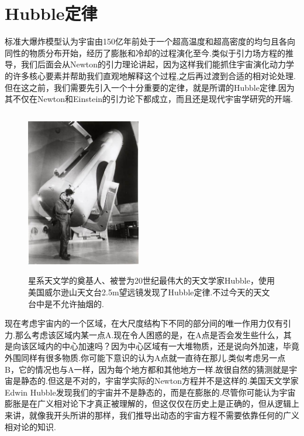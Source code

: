 \documentclass[a4paper]{book}
\begin{document}
\section{Hubble定律}
标准大爆炸模型认为宇宙由150亿年前处于一个超高温度和超高密度的均匀且各向同性的物质分布开始，经历了膨胀和冷却的过程演化至今.类似于引力场方程的推导，我们后面会从Newton的引力理论讲起，因为这样我们能抓住宇宙演化动力学的许多核心要素并帮助我们直观地解释这个过程,之后再过渡到合适的相对论处理.但在这之前，我们需要先引入一个十分重要的定律，就是所谓的Hubble定律.因为其不仅在Newton和Einstein的引力论下都成立，而且还是现代宇宙学研究的开端.\par 
\begin{figure}[!h]
	\centering
	\includegraphics[width=5cm,height=7.2cm]{figures/哈勃.eps}
	\caption{星系天文学的奠基人、被誉为20世纪最伟大的天文学家Hubble，使用美国威尔逊山天文台2.5m望远镜发现了Hubble定律.不过今天的天文台中是不允许抽烟的.}
\end{figure}\par 
现在考虑宇宙内的一个区域，在大尺度结构下不同的部分间的唯一作用力仅有引力.那么考虑该区域内某一点A.现在令人困惑的是，在A点是否会发生些什么，其是向该区域内的中心加速吗？因为中心区域有一大堆物质，还是说向外加速，毕竟外围同样有很多物质.你可能下意识的认为A点就一直待在那儿.类似考虑另一点B，它的情况也与A一样，因为每个地方都和其他地方一样.故很自然的猜测就是宇宙是静态的.但这是不对的，宇宙学实际的Newton方程并不是这样的.美国天文学家Edwin Hubble发现我们的宇宙并不是静态的，而是在膨胀的.尽管你可能认为宇宙膨胀是在广义相对论下才真正被理解的，但这仅仅在历史上是正确的，但从逻辑上来讲，就像我开头所讲的那样，我们推导出动态的宇宙方程不需要依靠任何的广义相对论的知识.\par 
\end{document}
